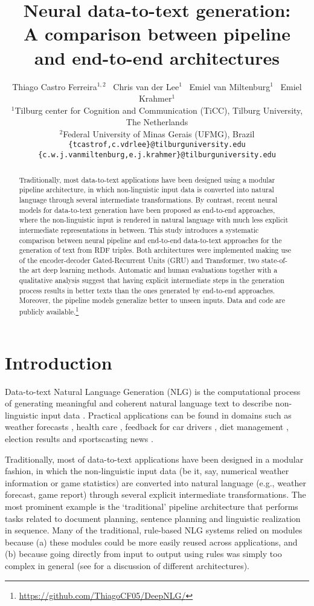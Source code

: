 \documentclass[11pt,a4paper]{article}
\title{Neural data-to-text generation: \\ 
A comparison between pipeline and end-to-end architectures}
\author{Thiago Castro Ferreira$^{1,2}$ \, Chris van der Lee$^{1}$ \, Emiel van Miltenburg$^{1}$ \, Emiel Krahmer$^{1}$ \\ 
         $^{1}$Tilburg center for Cognition and Communication (TiCC), Tilburg University, The Netherlands \\
         $^{2}$Federal University of Minas Gerais (UFMG), Brazil \\
         {\tt \{tcastrof,c.vdrlee\}@tilburguniversity.edu} \\
         {\tt \{c.w.j.vanmiltenburg,e.j.krahmer\}@tilburguniversity.edu}}
\date{}
\begin{document}
\maketitle
\begin{abstract}
  
  Traditionally, most data-to-text applications have been designed using a modular pipeline architecture, in which non-linguistic input data is converted into natural language through several intermediate transformations. By contrast, recent neural models for data-to-text generation have been proposed as end-to-end approaches, where the non-linguistic input is rendered in natural language with much less explicit intermediate representations in between. This study introduces a systematic comparison between neural pipeline and end-to-end data-to-text approaches for the generation of text from RDF triples. Both architectures were implemented making use of the encoder-decoder Gated-Recurrent Units (GRU) and Transformer, two state-of-the art deep learning methods. Automatic and human evaluations together with a qualitative analysis suggest that having explicit intermediate steps in the generation process results in better texts than the ones generated by end-to-end approaches. Moreover, the pipeline models generalize better to unseen inputs. Data and code are  publicly available.\footnote{\url{https://github.com/ThiagoCF05/DeepNLG/}}
  
\end{abstract}



\section{Introduction}

Data-to-text Natural Language Generation (NLG) is the computational process of generating meaningful and coherent natural language text to describe non-linguistic input data \cite{gatt2017}. Practical applications can be found in domains such as weather forecasts \citep{mei2016}, health care \citep{portet2009}, feedback for car drivers \citep{braun2018}, diet management \cite{mazzei2018}, election results \citep{leo2017} and sportscasting news \citep{chris2017}.

Traditionally, most of data-to-text applications have been designed in a modular fashion, in which the non-linguistic input data (be it, say, numerical weather information or game statistics) are converted into natural language (e.g., weather forecast, game report) through several explicit intermediate transformations. The most prominent example is the `traditional' pipeline architecture \citep{reiter2000} that performs tasks related to document planning, sentence planning and linguistic realization in sequence. 
Many of the traditional, rule-based NLG systems relied on modules because (a) these modules could be more easily reused across applications, and (b) because going directly from input to output using rules was simply too complex in general (see \citealt{gatt2017} for a discussion of different architectures). 
\end{document}

